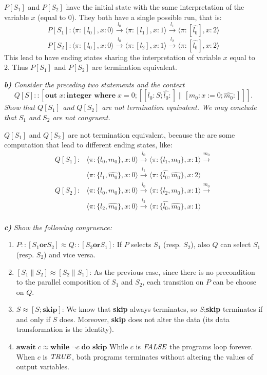 \documentclass[12pt]{article}
\newcommand{\T}{\ensuremath{\textrm{\emph{TRUE}}}\xspace}
\newcommand{\F}{\ensuremath{\textrm{\emph{FALSE}}}\xspace}
\begin{document}
$P[S_1]$ and $P[S_2]$ have the initial state with the same interpretation of the variable $x$ (equal to 0). They both have a single possible run, that is:
$$ P[S_1]: \langle \pi:[l_0],x:0\rangle \xrightarrow{l_0} \langle \pi:[l_1],x:1\rangle \xrightarrow{l_1} \langle \pi:[\hat{l_0}],x:2\rangle $$
$$ P[S_2]: \langle \pi:[l_0],x:0\rangle \xrightarrow{l_0} \langle \pi:[l_2],x:1\rangle \xrightarrow{l_2} \langle \pi:[\hat{l_0}],x:2\rangle $$
This lead to have ending states sharing the interpretation of variable $x$ equal to 2. Thus $P[S_1]$ and $P[S_2]$ are termination equivalent.

\medskip
\textit{\textbf{b)} Consider the preceding two statements and the context
$$Q[S]:: [\textbf{out}\;x: \textbf{integer where}\;x = 0; [[l_0: S; \hat{l_0}:] \parallel [m_0: x := 0 ; \hat{m_0}:]]].$$
Show that $Q[S_1]$ and $Q[S_2]$ are not termination equivalent. We may conclude that $S_1$ and $S_2$ are not congruent.}

$Q[S_1]$ and $Q[S_2]$ are not termination equivalent, because the are some computation that lead to different ending states, like:
\begin{align*}
Q[S_1]: &	\langle \pi:\{l_0,m_0\},x:0 \rangle \xrightarrow{l_0} 
			\langle \pi:\{l_1,m_0\},x:1 \rangle \xrightarrow{m_0} \\
		&	\langle \pi:\{l_1,\hat{m_0}\},x:0 \rangle \xrightarrow{l_1} 
			\langle \pi:\{\hat{l_0},\hat{m_0}\},x:2\rangle \\
Q[S_2]: &	\langle \pi:\{l_0,m_0\},x:0 \rangle \xrightarrow{l_0} 
			\langle \pi:\{l_2,m_0\},x:1 \rangle \xrightarrow{m_0} \\
		&	\langle \pi:\{l_2,\hat{m_0}\},x:0 \rangle \xrightarrow{l_2} 
			\langle \pi:\{\hat{l_0},\hat{m_0}\},x:1\rangle \\
\end{align*}

\medskip
\textit{\textbf{c)} Show the following congruence:}
\begin{enumerate}
\item $P::[S_1 \textbf{or} S_2] \approx Q::[S_2 \textbf{or} S_1]$: If $P$ selects $S_1$ (resp. $S_2$), also $Q$ can select $S_1$ (resp. $S_2$) and vice versa.
\item $[S_1 \parallel S_2] \approx [S_2 \parallel S_1]$: As the previous case, since there is no precondition to the parallel composition of $S_1$ and $S_2$, each transition on $P$ can be choose on $Q$.
\item $S \approx [S; \textbf{skip}]$: We know that \textbf{skip} always terminates, so $S$;\textbf{skip} terminates if and only if $S$ does. Moreover, \textbf{skip} does not alter the data (its data transformation is the identity).
\item $\textbf{await}\;c \approx \textbf{while}\;\neg c\;\textbf{do skip}$ While $c$ is $\F$ the programs loop forever. When $c$ is $\T$, both programs terminates without altering the values of output variables.
\end{enumerate}
\end{document}

